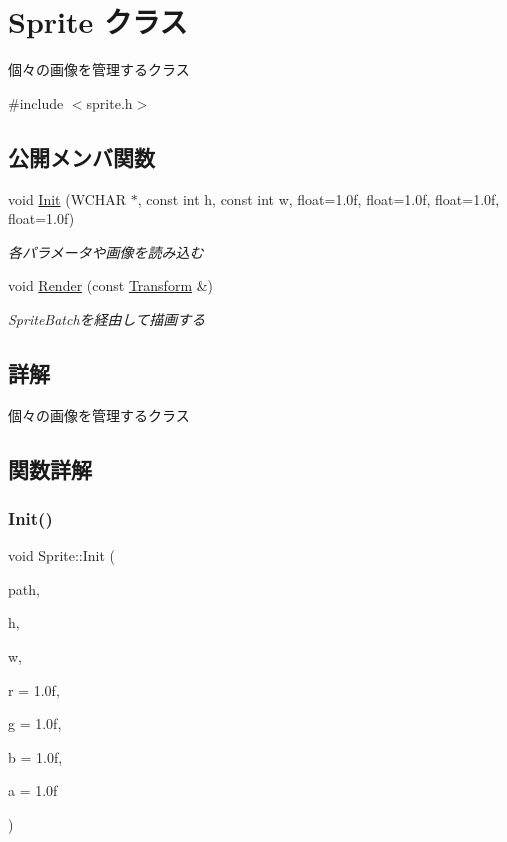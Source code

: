 \hypertarget{class_sprite}{}\section{Sprite クラス}
\label{class_sprite}


個々の画像を管理するクラス  




{\ttfamily \#include $<$sprite.\+h$>$}

\subsection*{公開メンバ関数}
\begin{DoxyCompactItemize}
\item 
void \mbox{\hyperlink{class_sprite_aee98328f5ff843a53c82cbcb0058e2f7}{Init}} (W\+C\+H\+AR $\ast$, const int h, const int w, float=1.\+0f, float=1.\+0f, float=1.\+0f, float=1.\+0f)
\begin{DoxyCompactList}\small\item\em 各パラメータや画像を読み込む \end{DoxyCompactList}\item 
void \mbox{\hyperlink{class_sprite_a6bc499c795fc0604d9bdb2336699b8c6}{Render}} (const \mbox{\hyperlink{class_transform}{Transform}} \&)
\begin{DoxyCompactList}\small\item\em Sprite\+Batchを経由して描画する \end{DoxyCompactList}\end{DoxyCompactItemize}


\subsection{詳解}
個々の画像を管理するクラス 

\subsection{関数詳解}
\mbox{\label{class_sprite_aee98328f5ff843a53c82cbcb0058e2f7}} 
\subsubsection{\texorpdfstring{Init()}{Init()}}
{\footnotesize\ttfamily void Sprite\+::\+Init (\begin{DoxyParamCaption}\item[{W\+C\+H\+AR $\ast$}]{path,  }\item[{const int}]{h,  }\item[{const int}]{w,  }\item[{float}]{r = {\ttfamily 1.0f},  }\item[{float}]{g = {\ttfamily 1.0f},  }\item[{float}]{b = {\ttfamily 1.0f},  }\item[{float}]{a = {\ttfamily 1.0f} }\end{DoxyParamCaption})}



